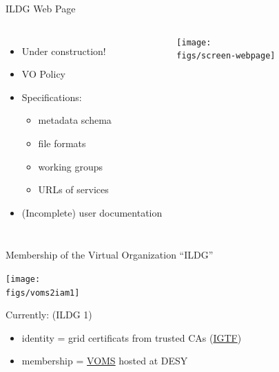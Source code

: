 \documentclass[aspectratio=169,xcolor=dvipsnames]{beamer}
\newcommand{\bi}{\begin{itemize}}
\newcommand{\ei}{\end{itemize}}
\def\figs{figs3}
\begin{document}
\begin{frame}{ILDG Web Page}
  
  \begin{columns}
    \bi
    \item Under construction!
    \item VO Policy
    \item Specifications:
      \bi
      \item metadata schema
      \item file formats
      \item working groups
      \item URLs of services
      \ei
    \item (Incomplete) user documentation
    \ei

    \texttt{[image: \\figs/screen-webpage]}
  \end{columns}
  
\end{frame}
\begin{frame}{Membership of the Virtual Organization ``ILDG''}

  \begin{center}
    \texttt{[image: \\figs/voms2iam1]}
    \hspace*{-10mm}
  \end{center}

  \vspace*{-3mm}
  Currently: (ILDG 1)
  \bi
  \item identity = grid certificats from \alert{trusted CAs} (\href{https://www.igtf.net/}{IGTF})
  \item membership = \href{https://grid-voms.desy.de:8443/voms/ildg/}{VOMS} hosted at DESY
  \ei

  \vspace*{20mm}

  \vfill
  
\end{frame}
   
\end{document}
